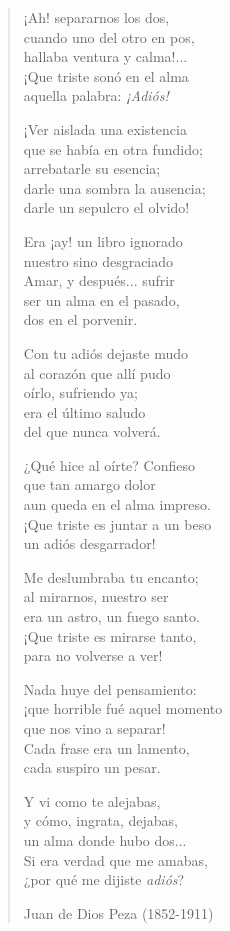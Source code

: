 \documentclass[12pt, twoside]{book}
\begin{document}
\begin{verse}
¡Ah! separarnos los dos,\\
cuando uno del otro en pos,\\
hallaba ventura y calma!...\\
¡Que triste sonó en el alma\\
aquella palabra: \textit{¡Adiós!}
\newline

¡Ver aislada una existencia\\
que se había en otra fundido;\\
arrebatarle su esencia;\\
darle una sombra la ausencia;\\
darle un sepulcro el olvido!
\newline

Era ¡ay! un libro ignorado\\
nuestro sino desgraciado\\
Amar, y después... sufrir\\
ser un alma en el pasado,\\
dos en el porvenir.
\newpage

Con tu adiós dejaste mudo\\
al corazón que allí pudo\\
oírlo, sufriendo ya;\\
era el último saludo\\
del que nunca volverá.
\newline

¿Qué hice al oírte? Confieso\\
que tan amargo dolor\\
aun queda en el alma impreso.\\
¡Que triste es juntar a un beso\\
un adiós desgarrador!
\newline

Me deslumbraba tu encanto;\\
al mirarnos, nuestro ser\\
era un astro, un fuego santo.\\
¡Que triste es mirarse tanto,\\
para no volverse a ver!
\newline

Nada huye del pensamiento:\\
¡que horrible fué aquel momento\\
que nos vino a separar!\\
Cada frase era un lamento,\\
cada suspiro un pesar.
\newline

Y vi como te alejabas,\\
y cómo, ingrata, dejabas,\\
un alma donde hubo dos...\\
Si era verdad que me amabas,\\
¿por qué me dijiste \textit{adiós}?
\newline

Juan de Dios Peza (1852-1911)
\end{verse}
\end{document}
